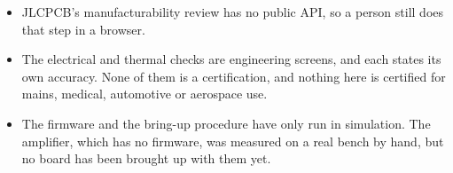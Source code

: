\documentclass[11pt]{article}
\begin{document}
\begin{itemize}[leftmargin=12pt,itemsep=2pt]
\item JLCPCB's manufacturability review has no public API, so a person still
      does that step in a browser.
\item The electrical and thermal checks are engineering screens, and each
      states its own accuracy. None of them is a certification, and nothing
      here is certified for mains, medical, automotive or aerospace use.
\item The firmware and the bring-up procedure have only run in simulation.
      The amplifier, which has no firmware, was measured on a real bench by
      hand, but no board has been brought up with them yet.
\end{itemize}

\end{document}
